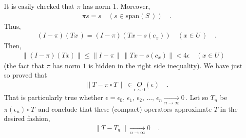 It is easily checked that $\pi$ has norm $1$. Moreover,
\begin{align}
\pi s = s \quad (s\in\text{span}(S\,))\quad .
\end{align}
Thus,
\begin{align}
(I-\pi) (Tx\,)= (I-\pi ) (Tx - s(c_x)) \quad (x\in U\,)\quad .
\end{align}
Then,
\begin{align}
\|( I- \pi )(T x) \| \leq \| I- \pi \| \, \| Tx -s(c_x)\| < 4 \epsilon  \quad (x\in U)\quad 
\end{align}
(the fact that $\pi$ has norm $1$ is hidden in the right side inequality). We have just so proved that 
\begin{align}
\| T-\pi\circ T\, \| \in \underset{\epsilon \sim 0}{O}(\epsilon) \quad . 
\end{align}
That is particularly true whether $\epsilon=\epsilon_0,\, \epsilon_1,\, \epsilon_2,\, \dots ,\, \epsilon_n \underset{n\to \infty}{\longrightarrow} 0\,$. Let so $T_n$ be $ \pi(\epsilon_n) \circ T\,$ and conclude that these (compact) operators approximate $T$ in the desired fashion, \ie
\begin{align}
\| T-T_n \| \underset{n \to \infty}{\longrightarrow} 0\quad .
\end{align}
\QED
